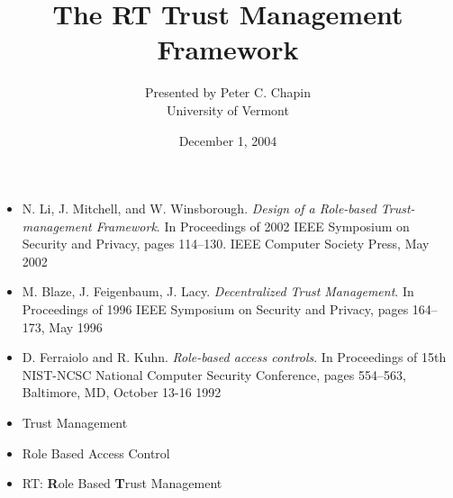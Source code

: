 \documentclass[landscape]{slides}
\begin{document}
\title{The RT Trust Management Framework}
\author{Presented by Peter C. Chapin\\University of Vermont}
\date{December 1, 2004}
\maketitle



\begin{itemize}

\item N. Li, J. Mitchell, and W. Winsborough. \textit{Design of a Role-based Trust-management Framework}. In Proceedings of 2002 IEEE Symposium on Security and Privacy, pages 114--130. IEEE Computer Society Press, May 2002

\item M. Blaze, J. Feigenbaum, J. Lacy. \textit{Decentralized Trust Management}. In Proceedings of 1996 IEEE Symposium on Security and Privacy, pages 164--173, May 1996

\item D. Ferraiolo and R. Kuhn. \textit{Role-based access controls}. In Proceedings of 15th NIST-NCSC National Computer Security Conference, pages 554--563, Baltimore, MD, October 13-16 1992

\end{itemize}
\stopslide



\begin{itemize}

\item Trust Management

\item Role Based Access Control

\item RT: \textbf{R}ole Based \textbf{T}rust Management

\end{itemize}

\stopslide


\end{document}
